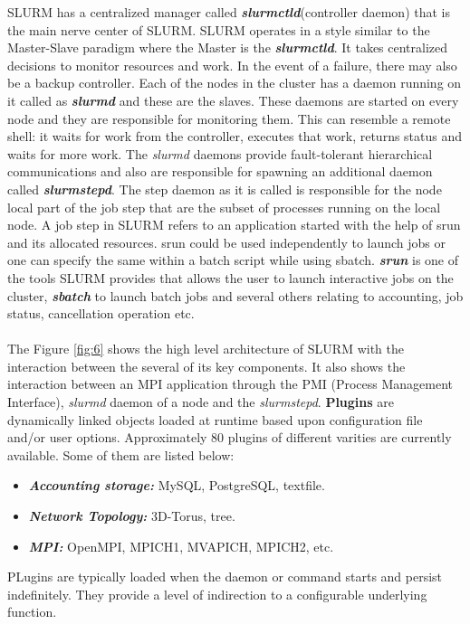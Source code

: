SLURM has a centralized manager called \textbf{\textit{slurmctld}}(controller daemon) that is the main nerve center of SLURM. SLURM operates in a style similar to the Master-Slave paradigm where the Master is the \textbf{\textit{slurmctld}}. It takes centralized decisions to monitor resources and work. In the event of a failure, there may also be a backup controller. Each of the nodes in the cluster has a daemon running on it called as \textbf{\textit{slurmd}} and these are the slaves. These daemons are started on every node and they are responsible for monitoring them. This can resemble a remote shell: it waits for work from the controller, executes that work, returns status and waits for more work. The \textit{slurmd} daemons provide fault-tolerant hierarchical communications and also are responsible for spawning an additional daemon called \textbf{\textit{slurmstepd}}. The step daemon as it is called is responsible for the node local part of the job step that are the subset of processes running on the local node. A job step in SLURM refers to an application started with the help of srun and its allocated resources. srun could be used independently to launch jobs or one can specify the same within a batch script while using sbatch. \textbf{\textit{srun}} is one of the tools SLURM provides that allows the user to launch interactive jobs on the cluster, \textbf{\textit{sbatch}} to launch batch jobs and several others relating to accounting, job status, cancellation operation etc.\\ \\
The Figure \ref{fig:6} shows the high level architecture of SLURM with the interaction between the several of its key components. It also shows the interaction between an MPI application through the PMI (Process Management Interface), \textit{slurmd} daemon of a node and the \textit{slurmstepd}.
\textbf{Plugins} are dynamically linked objects loaded at runtime based upon configuration file and/or user options. Approximately $80$ plugins of different varities are currently available. Some of them are listed below:
\begin{itemize}
\item \textbf{\textit{Accounting storage:}} MySQL, PostgreSQL, textfile.
\item \textbf{\textit{Network Topology:}} 3D-Torus, tree.
\item \textbf{\textit{MPI:}} OpenMPI, MPICH1, MVAPICH, MPICH2, etc.
\end{itemize}
PLugins are typically loaded when the daemon or command starts and persist indefinitely. They provide a level of indirection to a configurable underlying function.
